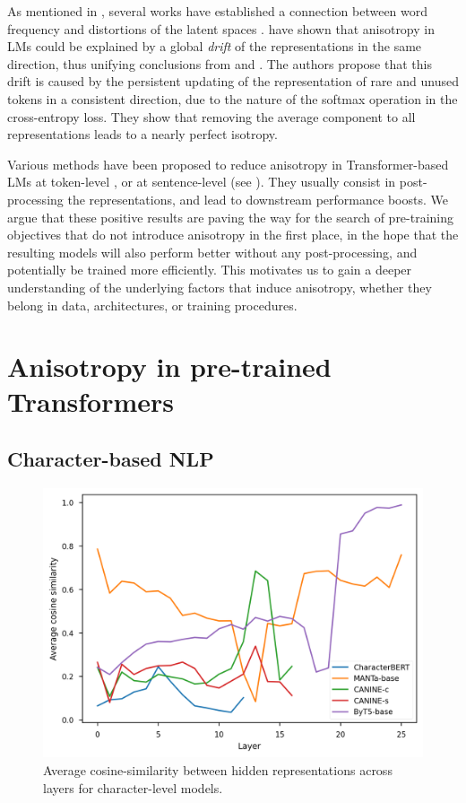 As mentioned in , several works have established a connection between word frequency and distortions of the latent spaces \citep{yu-etal-2022-rare, puccetti-etal-2022-outlier,rajaee-pilehvar-2022-isotropy}. \citet{bis-etal-2021-much} have shown that anisotropy in LMs could be explained by a global \textit{drift} of the representations in the same direction, thus unifying conclusions from \citet{ethayarajh-2019-contextual} and \citet{gao2018representation}. The authors propose that this drift is caused by the persistent updating of the representation of rare and unused tokens in a consistent direction, due to the nature of the softmax operation in the cross-entropy loss. They show that removing the average component to all representations leads to a nearly perfect isotropy.

Various methods have been proposed to reduce anisotropy in Transformer-based LMs at token-level \citep{rajaee-pilehvar-2021-cluster, Wang2020Improving}, or at sentence-level \citep{gao-etal-2021-simcse, yan-etal-2021-consert,su2021whiteningsentencerepresentationsbetter} (see ). They usually consist in post-processing the representations, and lead to downstream performance boosts. We argue that these positive results are paving the way for the search of pre-training objectives that do not introduce anisotropy in the first place, in the hope that the resulting models will also perform better without any post-processing, and potentially be trained more efficiently. This motivates us to gain a deeper understanding of the underlying factors that induce anisotropy, whether they belong in data, architectures, or training procedures.



\section{Anisotropy in pre-trained Transformers}
\subsection{Character-based NLP}
\label{sec:charbased}
\begin{figure}[ht]
    \centering
     \includegraphics[width=0.6\columnwidth]{sources/part_1/anisotropy/imgs/cosine_char_based.png}
     \caption{Average cosine-similarity between hidden representations across layers for character-level models.}
     \label{fig:cos_char_aware}
\end{figure}


